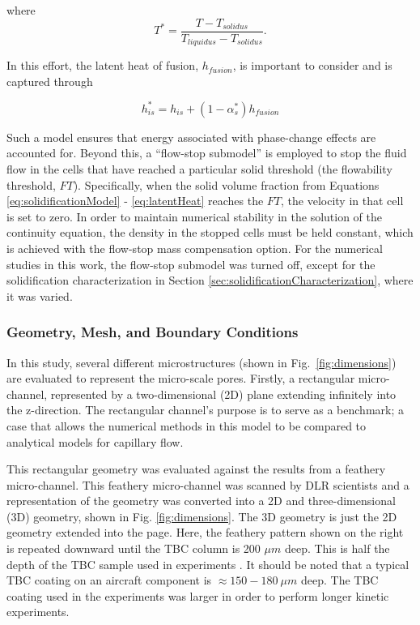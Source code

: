 \documentclass[%
 aip,
 amsmath,amssymb,
 reprint,%
floatfix]{revtex4-1}
\begin{document}
\noindent where
\begin{equation}
    T^{*} = \frac{T - T_{solidus}}{T_{liquidus} - T_{solidus}}.
\end{equation}

\noindent In this effort, the latent heat of fusion, $h_{fusion}$, is important to consider and is captured through 

\begin{equation}
    h_{is}^{*} = h_{is} + \left( 1 - \alpha_{s}^{*}\right)h_{fusion}
    \label{eq:latentHeat}
\end{equation}

\noindent Such a model ensures that energy associated with phase-change effects are accounted for. Beyond this, a ``flow-stop submodel'' is employed to stop the fluid flow in the cells that have reached a particular solid threshold (the flowability threshold, $FT$). Specifically, when the solid volume fraction from Equations \ref{eq:solidificationModel} - \ref{eq:latentHeat} reaches the $FT$, the velocity in that cell is set to zero. In order to maintain numerical stability in the solution of the continuity equation, the density in the stopped cells must be held constant, which is achieved with the flow-stop mass compensation option. For the numerical studies in this work, the flow-stop submodel was turned off, except for the solidification characterization in Section \ref{sec:solidificationCharacterization}, where it was varied. 

\subsubsection{Geometry, Mesh, and Boundary Conditions}

In this study, several different microstructures (shown in Fig.~\ref{fig:dimensions}) are evaluated to represent the micro-scale pores. Firstly, a rectangular micro-channel, represented by a two-dimensional (2D) plane extending infinitely into the z-direction. The rectangular channel's purpose is to serve as a benchmark; a case that allows the numerical methods in this model to be compared to analytical models for capillary flow. 

This rectangular geometry was  evaluated against the results from a feathery micro-channel. This feathery micro-channel was scanned by DLR scientists \cite{Sirigiri2018} and a representation of the geometry was converted into a 2D and three-dimensional (3D) geometry, shown in Fig. \ref{fig:dimensions}. The 3D geometry is just the 2D geometry extended into the page. Here, the feathery pattern shown on the right is repeated downward until the TBC column is 200 $\mu m$ deep. This is half the depth of the TBC sample used in experiments \cite{Naraparaju2019}. It should be noted that a typical TBC coating on an aircraft component is $\approx 150 - 180~\mu m$ deep. The TBC coating used in the experiments was larger in order to perform longer kinetic experiments. 
\end{document}
